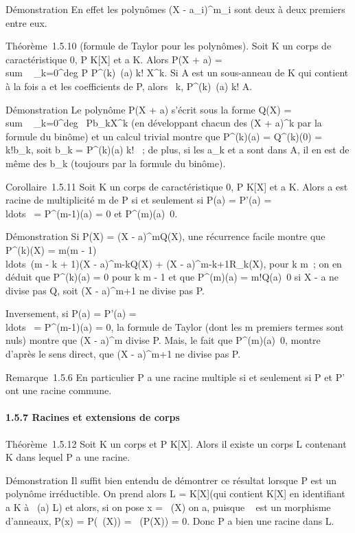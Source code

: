 Démonstration En effet les polynômes (X -
a_i)^m_i sont deux à deux premiers entre eux.

Théorème~1.5.10 (formule de Taylor pour les polynômes). Soit K un corps
de caractéristique 0, P \in K[X] et a \in K. Alors P(X + a)
= \\sum ~
_k=0^deg P P^(k)~(a)
\over k! X^k. Si A est un sous-anneau de K
qui contient à la fois a et les coefficients de P, alors
\forall~k, P^(k)~(a) \over
k! \in A.

Démonstration Le polynôme P(X + a) s'écrit sous la forme Q(X)
= \\sum ~
_k=0^deg~
Pb_kX^k (en développant chacun des (X +
a)^k par la formule du binôme) et un calcul trivial montre que
P^(k)(a) = Q^(k)(0) = k!b_k, soit
b_k = P^(k)(a) \over k! ~; de
plus, si les a_k et a sont dans A, il en est de même des
b_k (toujours par la formule du binôme).

Corollaire~1.5.11 Soit K un corps de caractéristique 0, P \in K[X] et
a \in K. Alors a est racine de multiplicité m de P si et seulement si P(a)
= P'(a) = \\ldots~ =
P^(m-1)(a) = 0 et
P^(m)(a)\neq~0.

Démonstration Si P(X) = (X - a)^mQ(X), une récurrence facile
montre que P^(k)(X) = m(m -
1)\\ldots~(m - k +
1)(X - a)^m-kQ(X) + (X - a)^m-k+1R_k(X),
pour k \leq m~; on en déduit que P^(k)(a) = 0 pour k \leq m - 1 et
que P^(m)(a) = m!Q(a)\neq~0 si X - a
ne divise pas Q, soit (X - a)^m+1 ne divise pas P.

Inversement, si P(a) = P'(a) =
\\ldots~ =
P^(m-1)(a) = 0, la formule de Taylor (dont les m premiers
termes sont nuls) montre que (X - a)^m divise P. Mais, le
fait que P^(m)(a)\neq~0, montre
d'après le sens direct, que (X - a)^m+1 ne divise pas P.

Remarque~1.5.6 En particulier P a une racine multiple si et seulement si
P et P' ont une racine commune.

\paragraph{1.5.7 Racines et extensions de corps}

Théorème~1.5.12 Soit K un corps et P \in K[X]. Alors il existe un
corps L contenant K dans lequel P a une racine.

Démonstration Il suffit bien entendu de démontrer ce résultat lorsque P
est un polynôme irréductible. On prend alors L = K[X]\diagupPK[X] (qui
contient K[X] en identifiant a \in K à \pi~(a) \in L) et alors, si on pose
x = \pi~(X) on a, puisque \pi~ est un morphisme d'anneaux, P(x) = P(\pi~(X)) =
\pi~(P(X)) = 0. Donc P a bien une racine dans L.

